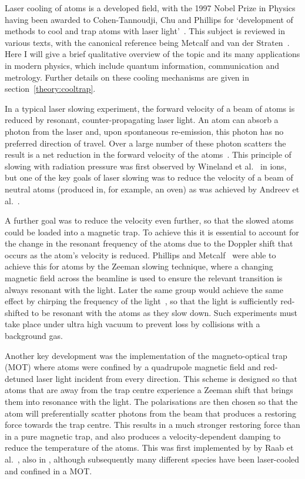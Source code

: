 Laser cooling of atoms is a developed field, with the 1997 Nobel Prize in
Physics having been awarded to Cohen-Tannoudji, Chu and Phillips for
`development of methods to cool and trap atoms with laser
light'~\cite{RevModPhys.70.721}. This subject is reviewed in various texts, with
the canonical reference being Metcalf and van der Straten~\cite{Metcalf1999}.
Here I will give a brief qualitative overview of the topic and its many
applications in modern physics, which include quantum information,
communication and metrology. Further details on these cooling mechanisms are
given in section~\ref{theory:cooltrap}.

In a typical laser slowing experiment, the forward velocity of a beam of atoms
is reduced by resonant, counter-propagating laser light. An atom can absorb a
photon from the laser and, upon spontaneous re-emission, this photon has no
preferred direction of travel. Over a large number of these photon scatters the
result is a net reduction in the forward velocity of the
atoms~\cite{PhysRevLett.40.1639}. This principle of slowing with radiation
pressure was first observed by Wineland et al.~\cite{PhysRevLett.40.1639} in
\Mg{} ions, but one of the key goals of laser slowing was to reduce the
velocity of a beam of neutral atoms (produced in, for example, an oven) as was
achieved by Andreev et al.~\cite{Andreev1981}.

A further goal was to reduce the velocity even further, so that the slowed atoms
could be loaded into a magnetic trap.  To achieve this it is essential to
account for the change in the resonant frequency of the atoms due to the
Doppler shift that occurs as the atom's velocity is reduced. Phillips and
Metcalf~\cite{PhysRevLett.48.596} were able to achieve this for \Na{} atoms by
the Zeeman slowing technique, where a changing magnetic field across the
beamline is used to ensure the relevant transition is always resonant with the
light. Later the same group would achieve the same effect by chirping the
frequency of the light~\cite{Prodan1984}, so that the light is sufficiently
red-shifted to be resonant with the atoms as they slow down.  Such experiments
must take place under ultra high vacuum to prevent loss by collisions with a
background gas.

Another key development was the implementation of the magneto-optical trap
(MOT) where atoms were confined by a quadrupole magnetic field and red-detuned
laser light incident from every direction. This scheme is designed so that
atoms that are away from the trap centre experience a Zeeman shift that brings
them into resonance with the light. The polarisations are then chosen so that
the atom will preferentially scatter photons from the beam that produces a
restoring force towards the trap centre. This results in a much stronger
restoring force than in a pure magnetic trap, and also produces a
velocity-dependent damping to reduce the temperature of the atoms. This was
first implemented by by Raab et al.~\cite{PhysRevLett.59.2631}, also in \Na{},
although subsequently many different species have been laser-cooled and
confined in a MOT.

